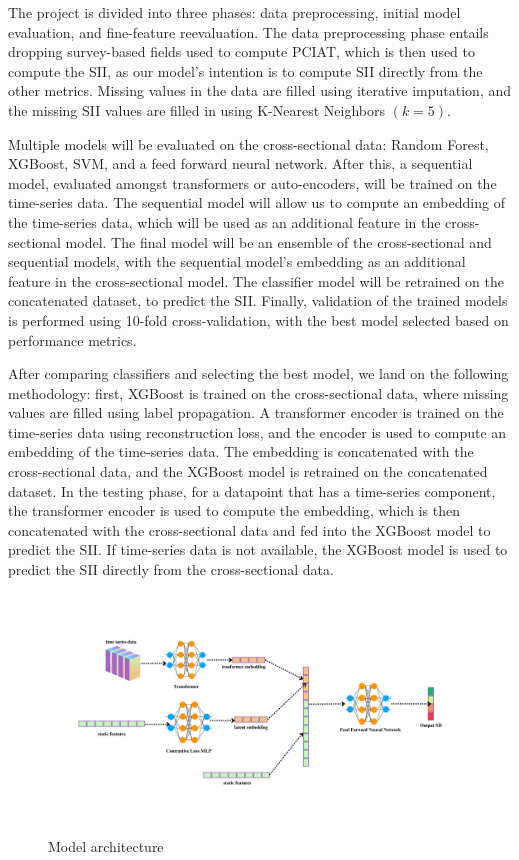 \documentclass[12pt]{extarticle}
\begin{document}
  The project is divided into three phases: data preprocessing, initial model evaluation, and fine-feature reevaluation.
  The data preprocessing phase entails dropping survey-based fields used to compute PCIAT, which is then used to compute the SII, as our model's intention is to compute SII directly from the other metrics.
  Missing values in the data are filled using iterative imputation, and the missing SII values are filled in using K-Nearest Neighbors $(k=5)$.

  Multiple models will be evaluated on the cross-sectional data: Random Forest, XGBoost, SVM, and a feed forward neural network. After this, a sequential model, evaluated amongst transformers or auto-encoders, will be trained on the time-series data. 
  The sequential model will allow us to compute an embedding of the time-series data, which will be used as an additional feature in the cross-sectional model.
  The final model will be an ensemble of the cross-sectional and sequential models, with the sequential model's embedding as an additional feature in the cross-sectional model. 
  The classifier model will be retrained on the concatenated dataset, to predict the SII.
  Finally, validation of the trained models is performed using 10-fold cross-validation, with the best model selected based on performance metrics.

  After comparing classifiers and selecting the best model, we land on the following methodology: 
  first, XGBoost is trained on the cross-sectional data, where missing values are filled using label propagation. 
  A transformer encoder is trained on the time-series data using reconstruction loss, and the encoder is used to compute an embedding of the time-series data. 
  The embedding is concatenated with the cross-sectional data, and the XGBoost model is retrained on the concatenated dataset.
  In the testing phase, for a datapoint that has a time-series component, the transformer encoder is used to compute the embedding, which is then concatenated with the cross-sectional data and fed into the XGBoost model to predict the SII. 
  If time-series data is not available, the XGBoost model is used to predict the SII directly from the cross-sectional data.

  \begin{figure}
    \centering
    \includegraphics[scale=0.25]{images/cmi-sii-architecture.png}
    \caption{Model architecture}
    \label{'table:architecture'}
  \end{figure}
\end{document}
